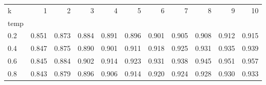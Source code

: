 \begin{tabular}{lrrrrrrrrrr}
\toprule
k & 1 & 2 & 3 & 4 & 5 & 6 & 7 & 8 & 9 & 10 \\
temp &  &  &  &  &  &  &  &  &  &  \\
\midrule
0.2 & 0.851 & 0.873 & 0.884 & 0.891 & 0.896 & 0.901 & 0.905 & 0.908 & 0.912 & 0.915 \\
0.4 & 0.847 & 0.875 & 0.890 & 0.901 & 0.911 & 0.918 & 0.925 & 0.931 & 0.935 & 0.939 \\
0.6 & 0.845 & 0.884 & 0.902 & 0.914 & 0.923 & 0.931 & 0.938 & 0.945 & 0.951 & 0.957 \\
0.8 & 0.843 & 0.879 & 0.896 & 0.906 & 0.914 & 0.920 & 0.924 & 0.928 & 0.930 & 0.933 \\
\bottomrule
\end{tabular}
